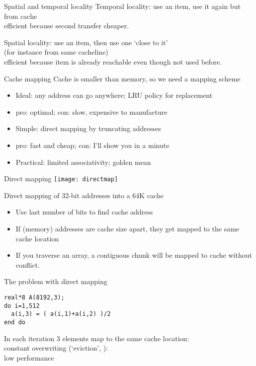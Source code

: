 \begin{frame}{Spatial and temporal locality}
  Temporal locality: use an item, use it again but from cache\\
  efficient because second transfer cheaper.

  Spatial locality: use an item, then use one `close to it'\\
  (for instance from same cacheline)\\
  efficient because item is already reachable even though not used before.
\end{frame}

\begin{frame}{Cache mapping}
  Cache is smaller than memory, so we need a mapping scheme
  \begin{itemize}
  \item Ideal: any address can go anywhere; LRU policy for replacement
  \item pro: optimal; con: slow, expensive to manufacture
  \item Simple: direct mapping by truncating addresses
  \item pro: fast and cheap; con: I'll show you in a minute
  \item Practical: limited associativity; golden mean
  \end{itemize}
\end{frame}

\begin{frame}{Direct mapping}
  \texttt{[image: directmap]}

Direct mapping of 32-bit addresses into a 64K cache
\begin{itemize}
\item Use last number of bits to find cache address
\item If (memory) addresses are cache size apart, they get mapped
  to the same cache location
\item If you traverse an array, a contiguous chunk will be mapped
  to cache without conflict.
\end{itemize}
\end{frame}

\begin{frame}[fragile]{The problem with direct mapping}
\begin{verbatim}
real*8 A(8192,3);
do i=1,512
  a(i,3) = ( a(i,1)+a(i,2) )/2
end do
\end{verbatim}
In each iteration 3 elements map to the same cache location:\\
constant overwriting (`eviction', ):\\
low performance
\end{frame}

